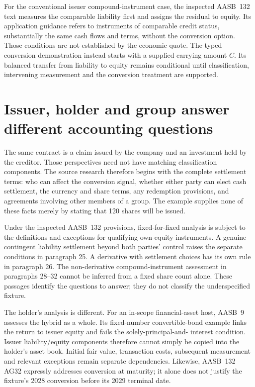 For the conventional issuer compound-instrument case, the inspected
AASB~132 text measures the comparable liability first and assigns the residual
to equity. Its application guidance refers to instruments of comparable credit
status, substantially the same cash flows and terms, without the conversion
option\citep[paragraphs31--32 and AG31]{aasb132}. Those conditions are not
established by the economic quote. The typed conversion demonstration instead
starts with a supplied carrying amount $C$. Its balanced transfer from liability
to equity remains conditional until classification, intervening measurement
and the conversion treatment are supported.

\section{Issuer, holder and group answer different accounting questions}
\label{sim:conversion-authority-scope}
The same contract is a claim issued by the company and an investment held by
the creditor. Those perspectives need not have matching classification
components. The source research therefore begins with the complete settlement
terms: who can affect the conversion signal, whether either party can elect
cash settlement, the currency and share terms, any redemption provisions, and
agreements involving other members of a group. The example supplies none of
these facts merely by stating that 120 shares will be issued.

Under the inspected AASB~132 provisions, fixed-for-fixed analysis is subject
to the definitions and exceptions for qualifying own-equity instruments.
A genuine contingent liability settlement beyond both parties' control raises
the separate conditions in paragraph 25. A derivative with settlement choices
has its own rule in paragraph 26. The non-derivative compound-instrument
assessment in paragraphs 28--32 cannot be inferred from a fixed share count
alone\citep[paragraphs15--16,22--26 and28--32]{aasb132}. These passages identify
the questions to answer; they do not classify the underspecified fixture.

The holder's analysis is different. For an in-scope financial-asset host,
AASB~9 assesses the hybrid as a whole. Its fixed-number convertible-bond
example links the return to issuer equity and fails the solely-principal-and-
interest condition\citep[paragraphs4.3.2 and B4.1.14, Instrument F]{aasb9scope2026}.
Issuer liability/equity components therefore cannot simply be copied into the
holder's asset book. Initial fair value, transaction costs, subsequent
measurement and relevant exceptions remain separate dependencies. Likewise,
AASB~132 AG32 expressly addresses conversion at maturity; it alone does not
justify the fixture's 2028 conversion before its 2029 terminal date.

